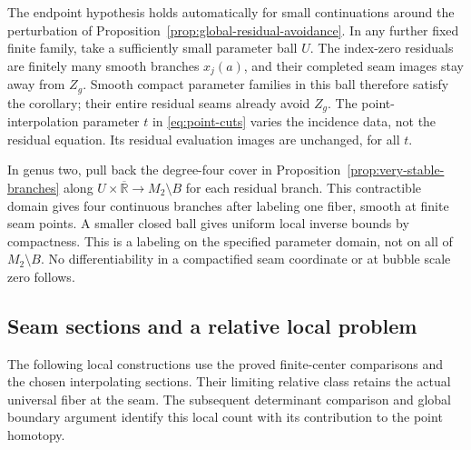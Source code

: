 \documentclass[11pt]{amsart}
\theoremstyle{definition}
\theoremstyle{remark}
\theoremstyle{plain}
\newcommand{\RR}{\mathbb{R}}
\begin{document}
The endpoint hypothesis holds automatically for small
continuations around the perturbation of
Proposition~\ref{prop:global-residual-avoidance}. In any
further fixed finite family, take a sufficiently small
parameter ball $U$. The index-zero residuals are finitely
many smooth branches $x_j(a)$, and their completed seam
images stay away from $Z_g$. Smooth compact parameter
families in this ball therefore satisfy the corollary;
their entire residual seams already avoid $Z_g$.
The point-interpolation parameter $t$ in
\eqref{eq:point-cuts} varies the incidence data, not the
residual equation. Its residual evaluation images are
unchanged, for all $t$.

In genus two, pull back the degree-four cover in
Proposition~\ref{prop:very-stable-branches} along
$U\times\overline{\RR}\to M_2\setminus B$ for each residual
branch. This contractible domain gives four continuous
branches after labeling one fiber, smooth at finite seam
points. A smaller closed ball gives uniform local inverse
bounds by compactness. This is a labeling on the specified
parameter domain, not on all of $M_2\setminus B$. No
differentiability in a compactified seam coordinate or at
bubble scale zero follows.


\subsection{Seam sections and a relative local problem}
\label{sec:local-seam-incidence}

The following local constructions use the proved finite-center
comparisons and the chosen interpolating sections. Their limiting
relative class retains the actual universal fiber at the seam.
The subsequent determinant comparison and global boundary
argument identify this local count with its contribution
to the point homotopy.
\end{document}
